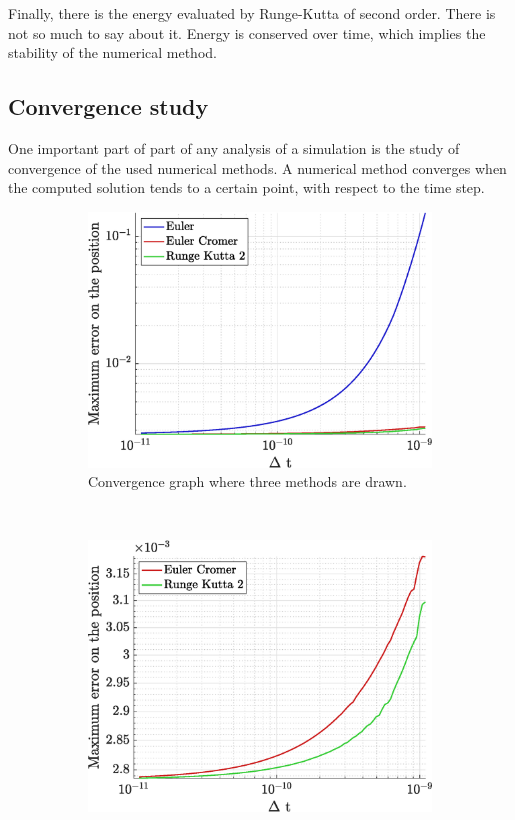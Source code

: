 \documentclass[a4paper,12pt,twoside]{article}
\begin{document}
Finally, there is the energy evaluated by Runge-Kutta of second order.
There is not so much to say about it. 
Energy is conserved over time, which implies the stability of the numerical method.\\



\subsection{Convergence study}\label{sec:etude-conv}
One important part of part of any analysis of a simulation is the study of convergence of the used numerical methods.
A numerical method converges when the computed solution tends to a certain point, with respect to the time step.

\begin{figure}[h]
\centering
\begin{subfigure}[t]{0.45\textwidth}
	\includegraphics[width=\textwidth]{graphs/ex2_ii_conv_ALL.eps}
	\caption{Convergence graph where three methods are drawn.}
	\label{fig:app1-conv-ALL}
\end{subfigure}
~
\begin{subfigure}[t]{0.45\textwidth}
	\includegraphics[width=\textwidth]{graphs/ex2_ii_conv_noEuler.eps}

\end{subfigure}
\end{figure}
\end{document}
